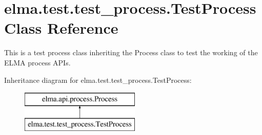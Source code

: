 \hypertarget{classelma_1_1test_1_1test__process_1_1TestProcess}{}\section{elma.\+test.\+test\+\_\+process.\+Test\+Process Class Reference}
\label{classelma_1_1test_1_1test__process_1_1TestProcess}


This is a test process class inheriting the Process class to test the working of the E\+L\+MA process A\+P\+Is.  


Inheritance diagram for elma.\+test.\+test\+\_\+process.\+Test\+Process\+:\begin{figure}[H]
\begin{center}
\leavevmode
\includegraphics[height=2.000000cm]{classelma_1_1test_1_1test__process_1_1TestProcess}
\end{center}
\end{figure}
